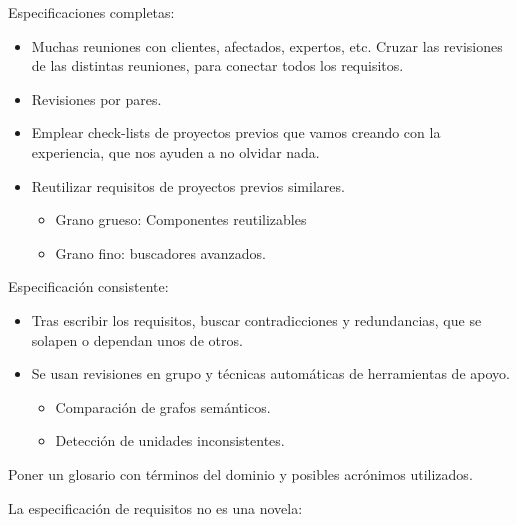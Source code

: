 \documentclass[12pt, twoside, openright]{report} %
\begin{document}
Especificaciones completas:

\begin{itemize}
	\item Muchas reuniones con clientes, afectados, expertos, etc. Cruzar
	      las revisiones de las distintas reuniones, para conectar todos los
	      requisitos.
	\item Revisiones por pares.
	\item Emplear check-lists de proyectos previos que vamos creando con la
	      experiencia, que nos ayuden a no olvidar nada.
	\item Reutilizar requisitos de proyectos previos similares.

	      \begin{itemize}
		      \item Grano grueso: Componentes reutilizables
		      \item Grano fino: buscadores avanzados.
	      \end{itemize}
\end{itemize}

Especificación consistente:

\begin{itemize}
	\item Tras escribir los requisitos, buscar contradicciones y
	      redundancias, que se solapen o dependan unos de otros.
	\item Se usan revisiones en grupo y técnicas automáticas de herramientas
	      de apoyo.

	      \begin{itemize}
		      \item Comparación de grafos semánticos.
		      \item Detección de unidades inconsistentes.
	      \end{itemize}
\end{itemize}

Poner un glosario con términos del dominio y posibles acrónimos
utilizados.

La especificación de requisitos no es una novela:
\end{document}
